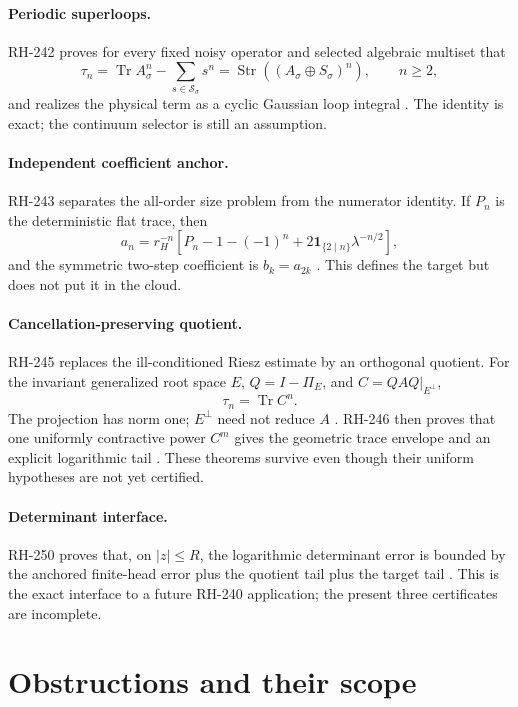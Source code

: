 \documentclass[11pt]{article}
\newcommand{\Tr}{\operatorname{Tr}}
\begin{document}
\paragraph{Periodic superloops.}
RH-242 proves for every fixed noisy operator and selected algebraic multiset
that
\[
 \tau_n=\Tr A_\sigma^n-\sum_{s\in\mathcal S_\sigma}s^n
 =\operatorname{Str}((A_\sigma\oplus S_\sigma)^n),\qquad n\ge2,
\]
and realizes the physical term as a cyclic Gaussian loop integral
\citep{WangRH242}.  The identity is exact; the continuum selector is still an
assumption.

\paragraph{Independent coefficient anchor.}
RH-243 separates the all-order size problem from the numerator identity.  If
$P_n$ is the deterministic flat trace, then
\[
 a_n=r_H^{-n}\left[P_n-1-(-1)^n
 +2\mathbf{1}_{\{2\mid n\}}\lambda^{-n/2}\right],
\]
and the symmetric two-step coefficient is $b_k=a_{2k}$
\citep{WangRH243}.  This defines the target but does not put it in the cloud.

\paragraph{Cancellation-preserving quotient.}
RH-245 replaces the ill-conditioned Riesz estimate by an orthogonal quotient.
For the invariant generalized root space $E$, $Q=I-\Pi_E$, and
$C=QAQ|_{E^\perp}$,
\[
 \tau_n=\Tr C^n.
\]
The projection has norm one; $E^\perp$ need not reduce $A$
\citep{WangRH245}.  RH-246 then proves that one uniformly contractive power
$C^m$ gives the geometric trace envelope and an explicit logarithmic tail
\citep{WangRH246}.  These theorems survive even though their uniform
hypotheses are not yet certified.

\paragraph{Determinant interface.}
RH-250 proves that, on $|z|\le R$, the logarithmic determinant error is bounded
by the anchored finite-head error plus the quotient tail plus the target tail
\citep{WangRH250}.  This is the exact interface to a future RH-240 application;
the present three certificates are incomplete.

\section{Obstructions and their scope}
\end{document}
